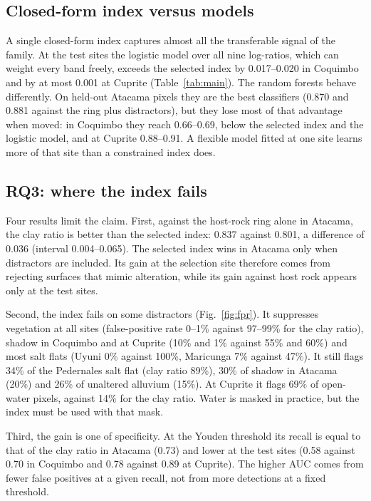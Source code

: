 \documentclass[preprint,authoryear,number]{elsarticle}
\begin{document}
\subsection{Closed-form index versus models}
\label{sec:models}

A single closed-form index captures almost all the transferable signal of the family. At the test sites the logistic model over all nine log-ratios, which can weight every band freely, exceeds the selected index by 0.017--0.020 in Coquimbo and by at most 0.001 at Cuprite (Table~\ref{tab:main}). The random forests behave differently. On held-out Atacama pixels they are the best classifiers (0.870 and 0.881 against the ring plus distractors), but they lose most of that advantage when moved: in Coquimbo they reach 0.66--0.69, below the selected index and the logistic model, and at Cuprite 0.88--0.91. A flexible model fitted at one site learns more of that site than a constrained index does.

\subsection{RQ3: where the index fails}
\label{sec:failures}

Four results limit the claim. First, against the host-rock ring alone in Atacama, the clay ratio is better than the selected index: 0.837 against 0.801, a difference of 0.036 (interval 0.004--0.065). The selected index wins in Atacama only when distractors are included. Its gain at the selection site therefore comes from rejecting surfaces that mimic alteration, while its gain against host rock appears only at the test sites.

Second, the index fails on some distractors (Fig.~\ref{fig:fpr}). It suppresses vegetation at all sites (false-positive rate 0--1\% against 97--99\% for the clay ratio), shadow in Coquimbo and at Cuprite (10\% and 1\% against 55\% and 60\%) and most salt flats (Uyuni 0\% against 100\%, Maricunga 7\% against 47\%). It still flags 34\% of the Pedernales salt flat (clay ratio 89\%), 30\% of shadow in Atacama (20\%) and 26\% of unaltered alluvium (15\%). At Cuprite it flags 69\% of open-water pixels, against 14\% for the clay ratio. Water is masked in practice, but the index must be used with that mask.

Third, the gain is one of specificity. At the Youden threshold its recall is equal to that of the clay ratio in Atacama (0.73) and lower at the test sites (0.58 against 0.70 in Coquimbo and 0.78 against 0.89 at Cuprite). The higher AUC comes from fewer false positives at a given recall, not from more detections at a fixed threshold.
\end{document}
